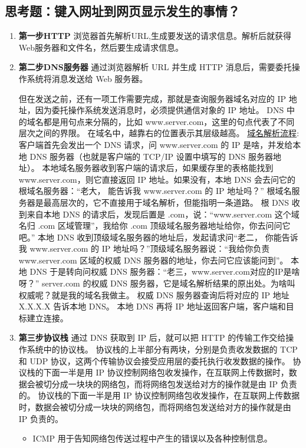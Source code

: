 \documentclass[11pt]{article}
\begin{document}
\subsection{思考题：键入网址到网页显示发生的事情？}
\label{sec:org3778f02}
\begin{enumerate}
\item \textbf{第一步HTTP}
浏览器首先解析URL,生成要发送的请求信息。解析后就获得Web服务器和文件名，然后要生成请求信息。
\item \textbf{第二步DNS服务器}
通过浏览器解析 URL 并生成 HTTP 消息后，需要委托操作系统将消息发送给 Web 服务器。

但在发送之前，还有一项工作需要完成，那就是查询服务器域名对应的 IP 地址，因为委托操作系统发送消息时，必须提供通信对象的 IP 地址。
DNS 中的域名都是用句点来分隔的，比如 www.server.com，这里的句点代表了不同层次之间的界限。
在域名中，越靠右的位置表示其层级越高。
\uline{域名解析流程}:
客户端首先会发出一个 DNS 请求，问 www.server.com 的 IP 是啥，并发给本地 DNS 服务器（也就是客户端的 TCP/IP 设置中填写的 DNS 服务器地址）。
本地域名服务器收到客户端的请求后，如果缓存里的表格能找到 www.server.com，则它直接返回 IP 地址。如果没有，本地 DNS 会去问它的根域名服务器：“老大， 能告诉我 www.server.com 的 IP 地址吗？” 根域名服务器是最高层次的，它不直接用于域名解析，但能指明一条道路。
根 DNS 收到来自本地 DNS 的请求后，发现后置是 .com，说：“www.server.com 这个域名归 .com 区域管理”，我给你 .com 顶级域名服务器地址给你，你去问问它吧。”
本地 DNS 收到顶级域名服务器的地址后，发起请求问“老二， 你能告诉我 www.server.com 的 IP 地址吗？”顶级域名服务器说：“我给你负责 www.server.com 区域的权威 DNS 服务器的地址，你去问它应该能问到”。
本地 DNS 于是转向问权威 DNS 服务器：“老三，www.server.com对应的IP是啥呀？” server.com 的权威 DNS 服务器，它是域名解析结果的原出处。为啥叫权威呢？就是我的域名我做主。
权威 DNS 服务器查询后将对应的 IP 地址 X.X.X.X 告诉本地 DNS。
本地 DNS 再将 IP 地址返回客户端，客户端和目标建立连接。
\item \textbf{第三步协议栈}
通过 DNS 获取到 IP 后，就可以把 HTTP 的传输工作交给操作系统中的协议栈。
协议栈的上半部分有两块，分别是负责收发数据的 TCP 和 UDP 协议，这两个传输协议会接受应用层的委托执行收发数据的操作。
协议栈的下面一半是用 IP 协议控制网络包收发操作，在互联网上传数据时，数据会被切分成一块块的网络包，而将网络包发送给对方的操作就是由 IP 负责的。
协议栈的下面一半是用 IP 协议控制网络包收发操作，在互联网上传数据时，数据会被切分成一块块的网络包，而将网络包发送给对方的操作就是由 IP 负责的。
\begin{itemize}
\item ICMP 用于告知网络包传送过程中产生的错误以及各种控制信息。

\end{itemize}
\end{enumerate}
\end{document}
